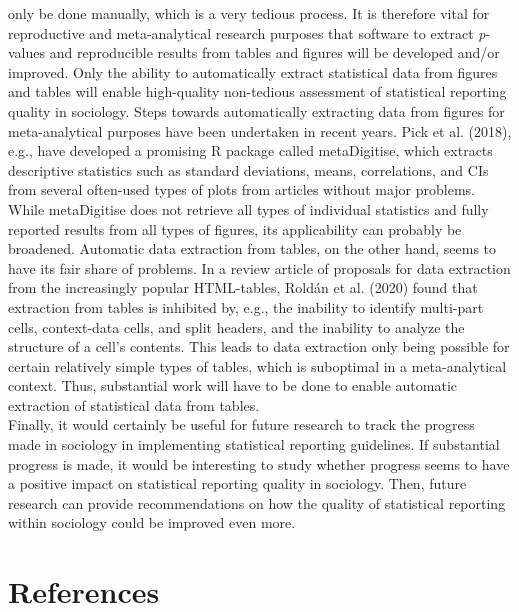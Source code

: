 \documentclass[
  12pt,
]{article}
\begin{document}
only be done manually, which is a very tedious process. It is therefore
vital for reproductive and meta-analytical research purposes that
software to extract \emph{p}-values and reproducible results from tables
and figures will be developed and/or improved. Only the ability to
automatically extract statistical data from figures and tables will
enable high-quality non-tedious assessment of statistical reporting
quality in sociology. Steps towards automatically extracting data from
figures for meta-analytical purposes have been undertaken in recent
years. Pick et al. (2018), e.g., have developed a promising R package
called metaDigitise, which extracts descriptive statistics such as
standard deviations, means, correlations, and CIs from several
often-used types of plots from articles without major problems. While
metaDigitise does not retrieve all types of individual statistics and
fully reported results from all types of figures, its applicability can
probably be broadened. Automatic data extraction from tables, on the
other hand, seems to have its fair share of problems. In a review
article of proposals for data extraction from the increasingly popular
HTML-tables, Roldán et al. (2020) found that extraction from tables is
inhibited by, e.g., the inability to identify multi-part cells,
context-data cells, and split headers, and the inability to analyze the
structure of a cell's contents. This leads to data extraction only being
possible for certain relatively simple types of tables, which is
suboptimal in a meta-analytical context. Thus, substantial work will
have to be done to enable automatic extraction of statistical data from
tables.\\
\hspace*{0.333em}\hspace*{0.333em}\hspace*{0.333em}\hspace*{0.333em}Finally,
it would certainly be useful for future research to track the progress
made in sociology in implementing statistical reporting guidelines. If
substantial progress is made, it would be interesting to study whether
progress seems to have a positive impact on statistical reporting
quality in sociology. Then, future research can provide recommendations
on how the quality of statistical reporting within sociology could be
improved even more.

\pagebreak

\hypertarget{references}{%
\section{References}\label{references}}
\end{document}
